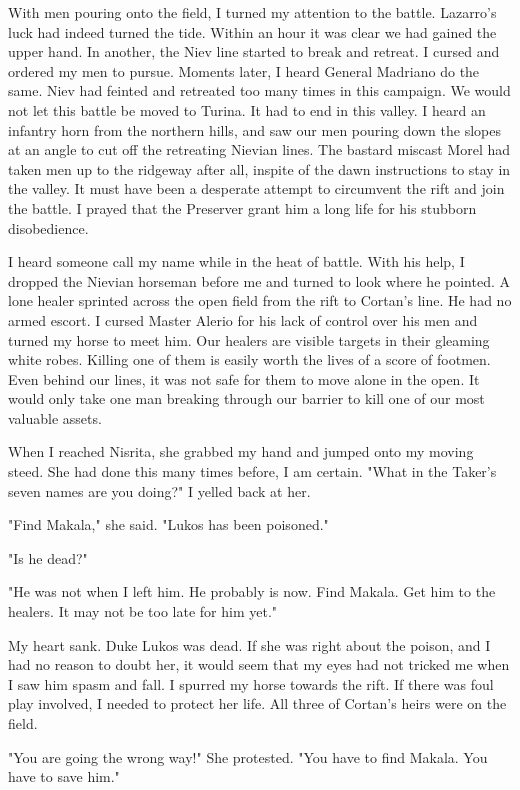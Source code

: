 \documentclass{article}
\begin{document}
With men pouring onto the field, I turned my attention to the battle. Lazarro's luck had indeed turned the tide. Within an hour it was clear we had gained the upper hand. In another, the Niev line started to break and retreat. I cursed and ordered my men to pursue. Moments later, I heard General Madriano do the same. Niev had feinted and retreated too many times in this campaign. We would not let this battle be moved to Turina. It had to end in this valley. I heard an infantry horn from the northern hills, and saw our men pouring down the slopes at an angle to cut off the retreating Nievian lines. The bastard miscast Morel had taken men up to the ridgeway after all, inspite of the dawn instructions to stay in the valley. It must have been a desperate attempt to circumvent the rift and join the battle. I prayed that the Preserver grant him a long life for his stubborn disobedience.

I heard someone call my name while in the heat of battle. With his help, I dropped the Nievian horseman before me and turned to look where he pointed. A lone healer sprinted across the open field from the rift to Cortan's line. He had no armed escort. I cursed Master Alerio for his lack of control over his men and turned my horse to meet him. Our healers are visible targets in their gleaming white robes. Killing one of them is easily worth the lives of a score of footmen. Even behind our lines, it was not safe for them to move alone in the open. It would only take one man breaking through our barrier to kill one of our most valuable assets.

When I reached Nisrita, she grabbed my hand and jumped onto my moving steed. She had done this many times before, I am certain. "What in the Taker's seven names are you doing?" I yelled back at her. 

"Find Makala," she said. "Lukos has been poisoned."

"Is he dead?"

"He was not when I left him. He probably is now. Find Makala. Get him to the healers. It may not be too late for him yet."

My heart sank. Duke Lukos was dead. If she was right about the poison, and I had no reason to doubt her, it would seem that my eyes had not tricked me when I saw him spasm and fall. I spurred my horse towards the rift. If there was foul play involved, I needed to protect her life. All three of Cortan's heirs were on the field.

"You are going the wrong way!" She protested. "You have to find Makala. You have to save him."
\end{document}
